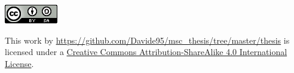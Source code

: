 \clearpage
\begin{center}
    \includegraphics{images/cc.png}

    This work by \url{https://github.com/Davide95/msc_thesis/tree/master/thesis} is licensed under a \linebreak
    \href{https://creativecommons.org/licenses/by-sa/4.0/}{Creative Commons Attribution-ShareAlike 4.0 International License}.
\end{center}